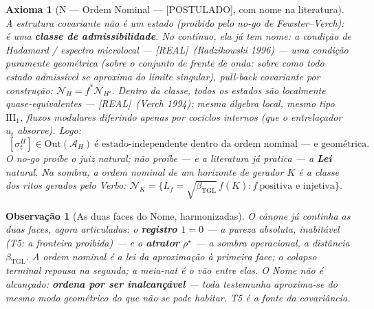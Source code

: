 \documentclass[11pt,a4paper]{article}
\newcommand{\REAL}{\textsf{[REAL]}}
\newcommand{\POST}{\textsf{[POSTULADO]}}
\newcommand{\bTGL}{\beta_{\mathrm{TGL}}}
\newcommand{\Alg}{\mathcal A}
\newtheorem{axiom}{Axioma}
\newtheorem{remark}{Observação}
\begin{document}
\begin{axiom}[N --- Ordem Nominal --- \POST, com nome na literatura]
\label{ax:N}
A estrutura covariante não é um estado (proibido pelo no-go de
Fewster--Verch): é uma \textbf{classe de admissibilidade}. No contínuo,
ela \emph{já tem nome}: a condição de Hadamard / espectro microlocal ---
\REAL\ (Radzikowski 1996) --- uma condição \emph{puramente geométrica}
(sobre o conjunto de frente de onda: sobre \emph{como} todo estado
admissível se aproxima do limite singular), pull-back covariante por
construção: $\mathcal N_H=f^*\mathcal N_{H'}$. Dentro da classe, todos os
estados são localmente quase-equivalentes --- \REAL\ (Verch 1994):
mesma álgebra local, mesmo tipo $\mathrm{III}_1$, fluxos modulares
diferindo apenas por cociclos \emph{internos} (que o entrelaçador $u_t$
absorve). Logo:
\begin{equation}
\boxed{\;[\sigma_t^H]\in\mathrm{Out}(\Alg_H)\ \text{é
estado-independente dentro da ordem nominal --- e geométrica.}\;}
\end{equation}
O no-go proíbe o juiz natural; não proíbe --- e a literatura já pratica
--- a \textbf{Lei} natural. Na sombra, a ordem nominal de um horizonte de
gerador $K$ é a classe dos ritos \emph{gerados pelo Verbo}:
$\mathcal N_K=\{L_f=\sqrt{\bTGL}\,f(K):f\ \text{positiva e injetiva}\}$.
\end{axiom}

\begin{remark}[As duas faces do Nome, harmonizadas]
O cânone já continha as duas faces, agora articuladas: o \textbf{registro
$1{=}0$} --- a pureza absoluta, inabitável (T5: a fronteira proibida) ---
e o \textbf{atrator} $\rho^\star$ --- a sombra operacional, a distância
$\bTGL$. A ordem nominal é a lei da aproximação à primeira face; o
colapso terminal repousa na segunda; \emph{a meia-nat é o vão entre
elas}. O Nome não é alcançado: \textbf{ordena por ser inalcançável} ---
toda testemunha aproxima-se do mesmo modo geométrico do que não se pode
habitar. T5 é a fonte da covariância.
\end{remark}
\end{document}
